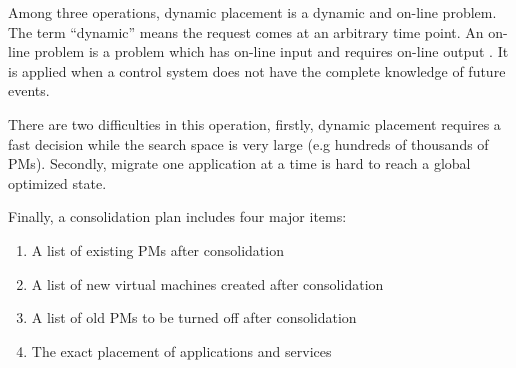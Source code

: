 \begin{enumerate}
	Among three operations, dynamic placement is a dynamic and on-line problem.
	The term ``dynamic'' means the request comes at an arbitrary time point. An on-line problem is a problem which has on-line input and requires on-line output \cite{Borodin:uQcy_H6C}. It is applied when a control system does not have the complete knowledge of future events.

	There are two difficulties in this operation, firstly, dynamic placement requires a fast decision while the search space is very large (e.g hundreds of thousands of PMs). Secondly, migrate one application at a time is hard to reach a global optimized state.

\end{enumerate}

Finally, a consolidation plan includes four major items:
			\begin{enumerate}
				\item A list of existing PMs after consolidation
				\item A list of new virtual machines created after consolidation
				\item A list of old PMs to be turned off after consolidation
				\item The exact placement of applications and services
			\end{enumerate}







